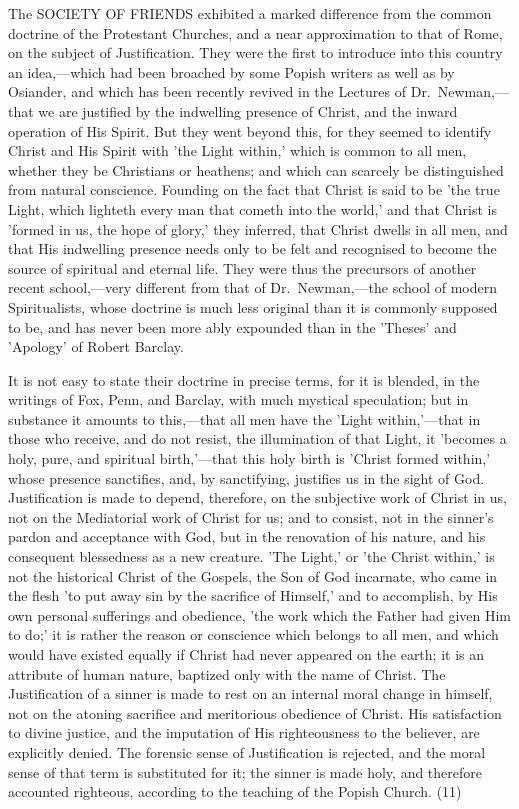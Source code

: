\documentclass[
]{book}
\begin{document}
The SOCIETY OF FRIENDS exhibited a marked difference from the common doctrine of the Protestant Churches, and a near approximation to that of Rome, on the subject of Justification. They were the first to introduce into this country an idea,---which had been broached by some Popish writers as well as by Osiander, and which has been recently revived in the Lectures of Dr.~Newman,---that we are justified by the indwelling presence of Christ, and the inward operation of His Spirit. But they went beyond this, for they seemed to identify Christ and His Spirit with 'the Light within,' which is common to all men, whether they be Christians or heathens; and which can scarcely be distinguished from natural conscience. Founding on the fact that Christ is said to be 'the true Light, which lighteth every man that cometh into the world,' and that Christ is 'formed in us, the hope of glory,' they inferred, that Christ dwells in all men, and that His indwelling presence needs only to be felt and recognised to become the source of spiritual and eternal life. They were thus the precursors of another recent school,---very different from that of Dr.~Newman,---the school of modern Spiritualists, whose doctrine is much less original than it is commonly supposed to be, and has never been more ably expounded than in the 'Theses' and 'Apology' of Robert Barclay.

It is not easy to state their doctrine in precise terms, for it is blended, in the writings of Fox, Penn, and Barclay, with much mystical speculation; but in substance it amounts to this,---that all men have the 'Light within,'---that in those who receive, and do not resist, the illumination of that Light, it 'becomes a holy, pure, and spiritual birth,'---that this holy birth is 'Christ formed within,' whose presence sanctifies, and, by sanctifying, justifies us in the sight of God. Justification is made to depend, therefore, on the subjective work of Christ in us, not on the Mediatorial work of Christ for us; and to consist, not in the sinner's pardon and acceptance with God, but in the renovation of his nature, and his consequent blessedness as a new creature. 'The Light,' or 'the Christ within,' is not the historical Christ of the Gospels, the Son of God incarnate, who came in the flesh 'to put away sin by the sacrifice of Himself,' and to accomplish, by His own personal sufferings and obedience, 'the work which the Father had given Him to do;' it is rather the reason or conscience which belongs to all men, and which would have existed equally if Christ had never appeared on the earth; it is an attribute of human nature, baptized only with the name of Christ. The Justification of a sinner is made to rest on an internal moral change in himself, not on the atoning sacrifice and meritorious obedience of Christ. His satisfaction to divine justice, and the imputation of His righteousness to the believer, are explicitly denied. The forensic sense of Justification is rejected, and the moral sense of that term is substituted for it; the sinner is made holy, and therefore accounted righteous, according to the teaching of the Popish Church. (11)
\end{document}
